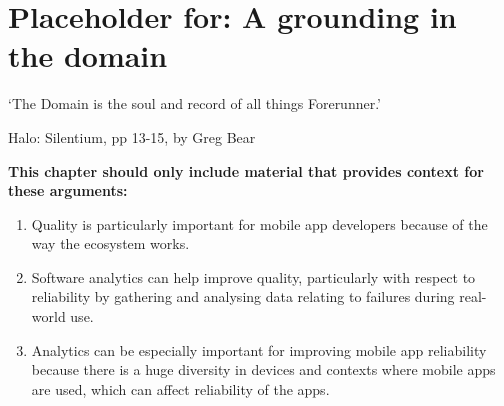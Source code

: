 \chapter{Placeholder for: A grounding in the domain}\label{chapter-preparing-the-ground}%

\epigraph{`The Domain is the soul and record of all things Forerunner.'}{Halo: Silentium, pp 13-15, by Greg Bear}

\bigskip

\begin{kaobox}[frametitle=Context for this chapter]
\textbf{This chapter should only include material that provides context for these arguments:}
\begin{enumerate}[start=3]
    \item Quality is particularly important for mobile app developers because of the way the ecosystem works.
    \item Software analytics can help improve quality, particularly with respect to reliability by gathering and analysing data relating to failures during real-world use.
    \item Analytics can be especially important for improving mobile app reliability because there is a huge diversity in devices and contexts where mobile apps are used, which can affect reliability of the apps.
\end{enumerate}
\end{kaobox}

